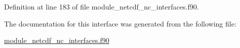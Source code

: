 Definition at line 183 of file module\+\_\+netcdf\+\_\+nc\+\_\+interfaces.\+f90.



The documentation for this interface was generated from the following file\+:\begin{DoxyCompactItemize}
\item 
\hyperlink{module__netcdf__nc__interfaces_8f90}{module\+\_\+netcdf\+\_\+nc\+\_\+interfaces.\+f90}\end{DoxyCompactItemize}
